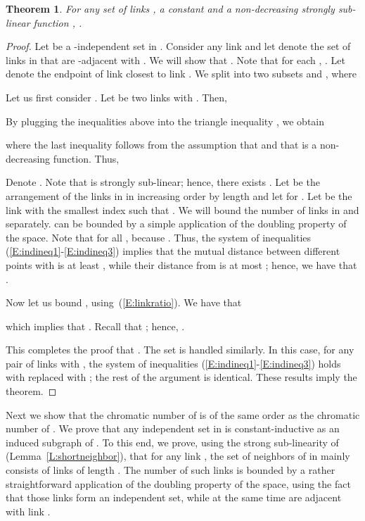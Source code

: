 \documentclass[11pt]{article}
\newtheorem{theorem}{Theorem}
\begin{document}
\begin{theorem}\label{T:inductiveness}
For any set of links , a constant  and a non-decreasing strongly sub-linear function , . 
\end{theorem}
	\begin{proof}
	Let  be a -independent set in . Consider any link  and let  denote the set of links in  that are -adjacent with . We will show that . 
	Note that for each , . Let  denote the endpoint of link  closest to link .  We split  into two subsets  and , where
	
	Let us first consider .
	Let  be two links with . Then,
	
	 By plugging the inequalities above into the triangle inequality , we obtain
	
	where the last inequality follows from the assumption that  and that  is a non-decreasing function. Thus, 
	
	Denote . Note that  is strongly sub-linear; hence, there exists .
	Let  be the arrangement of the links in  in increasing order by length and let  for  . Let  be the link with the smallest index such that . We will bound the number of links in  and  separately.  can be bounded by a simple application of the doubling property of the space. Note that for all ,  because . Thus, the system of inequalities (\ref{E:indineq1}-\ref{E:indineq3}) implies that the mutual distance between different points  with  is at least , while their distance from  is at most ; hence, we have that .
	
	Now let us bound , using~(\ref{E:linkratio}). We have that
	
	which implies that . Recall that ; hence, . 
	
	This completes the proof that . The set  is handled similarly. In this case, for any pair of links  with , the system of inequalities (\ref{E:indineq1}-\ref{E:indineq3}) holds with  replaced with ;
	the rest of the argument is identical. These results imply the theorem.
	\end{proof}

Next we show that the chromatic number of  is of the same order as the chromatic number of . We prove that any independent set  in  is constant-inductive as an induced subgraph of . To this end, we prove, using the strong sub-linearity of  (Lemma~\ref{L:shortneighbor}),
  that for any link , the set of neighbors of  in  mainly consists of links of length . The number of such links is bounded by a rather straightforward application of the doubling property of the space, using the fact that those links form an independent set, while at the same time are adjacent with link .
\end{document}

